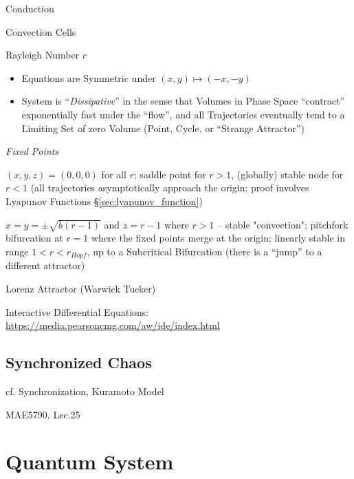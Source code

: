 Conduction

Convection Cells

Rayleigh Number $r$

\begin{itemize}
  \item Equations are Symmetric under $(x,y) \mapsto (-x,-y)$
  \item System is ``\emph{Dissipative}'' in the sense that Volumes in Phase
    Space ``contract'' exponentially fast under the ``flow'', and all
    Trajectories eventually tend to a Limiting Set of zero Volume (Point, Cycle,
    or ``Strange Attractor'')
\end{itemize}

\emph{Fixed Points}

$(x,y,z) = (0,0,0)$ for all $r$; saddle point for $r > 1$, (globally) stable
node for $r < 1$ (all trajectories asymptotically approach the origin; proof
involves Lyapunov Functions \S\ref{sec:lyapunov_function})

$x = y = \pm\sqrt{b(r-1)}$ and $z = r-1$ where $r > 1$ -- stable "convection";
pitchfork bifurcation at $r=1$ where the fixed points merge at the origin;
linearly stable in range $1 < r < r_{Hopf}$, up to a Subcritical Bifurcation
(there is a ``jump'' to a different attractor)

Lorenz Attractor (Warwick Tucker)

Interactive Differential Equations:
\url{https://media.pearsoncmg.com/aw/ide/index.html}



\subsection{Synchronized Chaos}\label{sec:synchronized_chaos}

cf. Synchronization, Kuramoto Model

MAE5790, Lec.25



\section{Quantum System}\label{sec:quantum_system}


